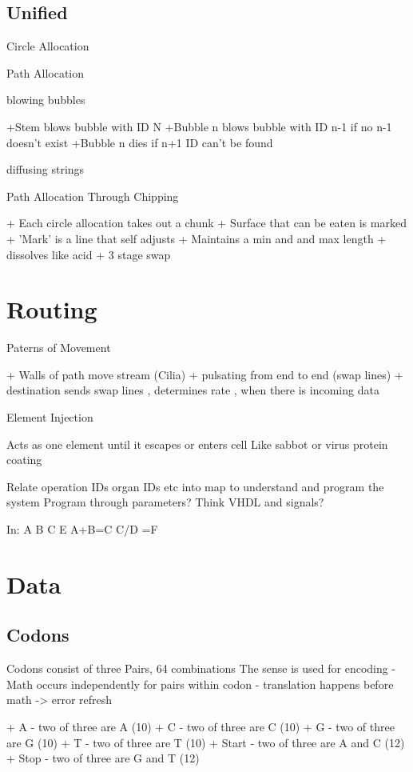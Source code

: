 \documentclass[article]{memoir}
\begin{document}
\subsection{Unified}

Circle Allocation

Path Allocation

blowing bubbles

+Stem blows bubble with ID N
+Bubble n blows bubble with ID n-1 if no n-1 doesn't exist
+Bubble n dies if n+1 ID can't be found 

diffusing strings

Path Allocation Through Chipping

+ Each circle allocation takes out a chunk
+ Surface that can be eaten is marked
+ 'Mark' is a line that self adjusts
+ Maintain​s a min and and max length
+ dissolves like acid
+ 3 stage swap


\section{Routing}

Paterns of Movement

+ Walls of path move stream (Cilia)
+ pulsating from end to end (swap lines)
+ destination sends swap lines , determines rate , when there is incoming data

Element Injection

Acts as one element until it escapes or enters cell
Like sabbot or virus protein coating


Relate operation IDs organ IDs etc into map to understand and program the system
Program through parameters?
Think VHDL and signals?

In: A B C E
A+B=C
C/D =F


\section{Data}

\subsection{Codons}
Codons consist of three Pairs, 64 combinations
The sense is used for encoding
- Math occurs independently for pairs within codon
- translation happens before math -> error refresh

+ A - two of three are A (10)
+ C - two of three are C (10)
+ G - two of three are G (10)
+ T - two of three are T (10)
+ Start - two of three are A and C (12)
+ Stop - two of three are G and T (12)
\end{document}
